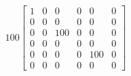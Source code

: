 \documentclass[preview]{standalone}
\begin{document}
\begin{align*}
100 \left[\begin{matrix}1 & 0 & 0 & 0 & 0 & 0\\0 & 0 & 0 & 0 & 0 & 0\\0 & 0 & 100 & 0 & 0 & 0\\0 & 0 & 0 & 0 & 0 & 0\\0 & 0 & 0 & 0 & 100 & 0\\0 & 0 & 0 & 0 & 0 & 0\end{matrix}\right]
\end{align*}
\end{document}
